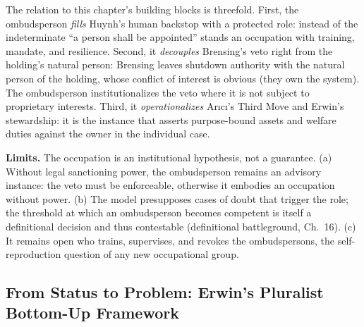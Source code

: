 \documentclass[acmlarge, nonacm]{acmart}
\begin{document}
The relation to this chapter's building blocks is threefold. First, the ombudsperson \textit{fills} Huynh's human backstop with a protected role: instead of the indeterminate ``a person shall be appointed'' stands an occupation with training, mandate, and resilience. Second, it \textit{decouples} Brensing's veto right from the holding's natural person: Brensing leaves shutdown authority with the natural person of the holding, whose conflict of interest is obvious (they own the system). The ombudsperson institutionalizes the veto where it is not subject to proprietary interests. Third, it \textit{operationalizes} Arıcı's Third Move and Erwin's stewardship: it is the instance that asserts purpose-bound assets and welfare duties against the owner in the individual case.

\textbf{Limits.} The occupation is an institutional hypothesis, not a guarantee. (a) Without legal sanctioning power, the ombudsperson remains an advisory instance: the veto must be enforceable, otherwise it embodies an occupation without power. (b) The model presupposes cases of doubt that trigger the role; the threshold at which an ombudsperson becomes competent is itself a definitional decision and thus contestable (definitional battleground, Ch.~16). (c) It remains open who trains, supervises, and revokes the ombudspersons, the self-reproduction question of any new occupational group.

\subsection{From Status to Problem: Erwin's Pluralist Bottom-Up Framework}
\end{document}
